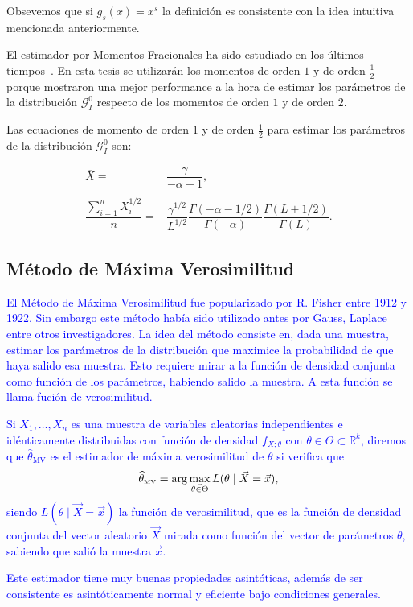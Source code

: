 Obsevemos que si $g_s(x)=x^s$ la definición es consistente con la idea intuitiva mencionada anteriormente.
%

El estimador por Momentos Fracionales ha sido estudiado en los últimos tiempos~\cite{Frery97,GambiniSC08,Khan2013}. En esta tesis se utilizarán los momentos de orden $1$ y de orden $\frac{1}{2}$ porque mostraron una mejor performance a la hora de estimar los parámetros de la distribución $\mathcal G_I^0$ respecto de los momentos de orden $1$ y de orden $2$.

Las ecuaciones de momento de orden $1$ y de orden $\frac{1}{2}$ para estimar los parámetros de la distribución $\mathcal G_I^0$ son:

\begin{align}
\label{momento1medio}
\nonumber \overline{X}=&\dfrac{\gamma}{-\alpha - 1}, \\
\nonumber \\ 
\dfrac{\sum_{i=1}^n X_i^{1/2}}{n}=&\dfrac{\gamma^{1/2}}{L^{1/2}}\dfrac{\Gamma(-\alpha - 1/2)}{\Gamma(-\alpha)}\dfrac{\Gamma(L+ 1/2)}{\Gamma(L)}.
\end{align}


\subsection{Método de Máxima Verosimilitud}

\textcolor{blue}{
 El Método de Máxima Verosimilitud fue popularizado por R. Fisher entre 1912 y 1922. Sin embargo este método había sido utilizado antes por Gauss, Laplace entre otros investigadores. La idea del método consiste en, dada una muestra, estimar los parámetros de la distribución que maximice la probabilidad de que haya salido esa muestra. Esto requiere mirar a la función de densidad conjunta como función de los parámetros, habiendo salido la muestra. A esta función se llama fución de verosimilitud.
\begin{definition}
Si $X_1, \ldots, X_n$ es una muestra de variables aleatorias independientes e idénticamente distribuidas con función de densidad $f_{X;\theta}$  con $\theta \in \Theta \subset \mathbb{R}^k$, diremos que $\widehat{\theta}_{\text{MV}}$ es el estimador de máxima verosimilitud de $\theta$ si verifica que 
\begin{align}
\widehat{\theta}_{{\text{\tiny{\text{MV}}}}}=\arg\max_{\vec{\theta \in \Theta}} L(\theta \mid \vec{X}=\vec{x}),
\end{align}
siendo $L(\theta \mid \vec{X}=\vec{x})$ la función de verosimilitud, que es la función de densidad conjunta del vector aleatorio $\vec{X}$ mirada como función del vector de parámetros $\theta$, sabiendo que salió la muestra $\vec{x}$.
\end{definition}
Este estimador tiene muy buenas propiedades asintóticas, además de ser consistente es asintóticamente normal y eficiente bajo condiciones generales.
}

